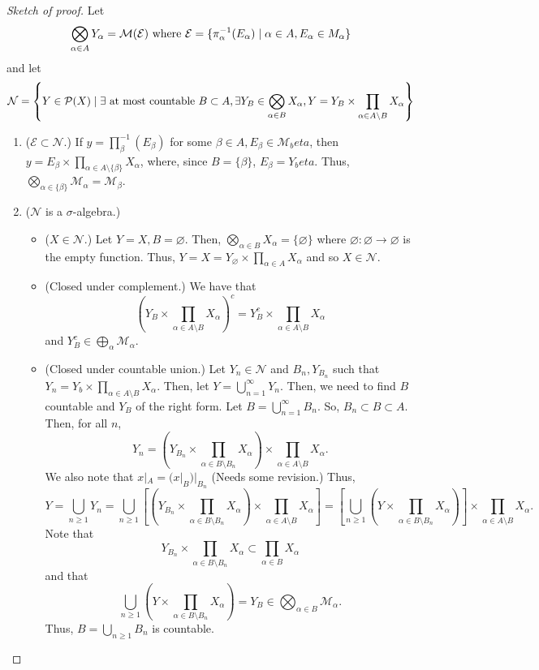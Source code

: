 \documentclass[11pt,leqno,oneside]{amsbook}
\numberwithin{thm}{section}
\renewcommand{\P}{\mathcal{P}} %
\newcommand{\M}{\mathcal{M}} %
\newcommand{\Ep}{\mathcal{E}} %
\newcommand{\s}{$\sigma$-} %
\begin{document}
\begin{proof}[Sketch of proof]
  Let \[
    \bigotimes_{\alpha \in A} Y_\alpha = \M(\Ep) \text{ where } \Ep =
    \{\pi_\alpha^{-1}(E_\alpha) \st \alpha \in A, E_\alpha \in M_\alpha\}
  \] and let \[
    \mathcal{N} = \left\{ Y \in \P(X) \st \exists \text{ at most countable
    } B \subset A, \exists Y_B \in \bigotimes_{\alpha \in B} X_\alpha,
    Y = Y_B \times \prod_{\alpha \in A \setminus B} X_\alpha \right\}
  \]
  \begin{enumerate}
  \item ($\Ep \subset \mathcal{N}$.) If $y =
    \prod_\beta^{-1}(E_\beta)$ for some $\beta \in A, E_\beta \in
    \M_beta$, then $y = E_\beta \times \prod_{\alpha \in A \setminus
      \{\beta\}} X_\alpha$, where, since $B = \{\beta\}$, $E_\beta =
    Y_beta$. Thus, $\bigotimes_{\alpha \in \{\beta\}} \M_\alpha =
    \M_\beta$.
  \item ($\mathcal{N}$ is a \s algebra.)
    \begin{itemize}
    \item ($X \in \mathcal{N}$.) Let $Y = X, B = \varnothing$. Then,
      $\bigotimes_{\alpha \in B} X_\alpha = \{\pmb{\varnothing}\}$
      where $\pmb{\varnothing}: \varnothing \to \varnothing$ is the
      empty function. Thus, $Y = X = Y_\varnothing \times
      \prod_{\alpha \in A} X_\alpha$ and so $X \in \mathcal{N}$.
    \item (Closed under complement.) We have that \[
        \left( Y_B \times \prod_{\alpha \in A \setminus B} X_\alpha
        \right)^c = Y_B^c \times \prod_{\alpha \in A \setminus B} X_\alpha
      \]
      and $Y_B^c \in \bigoplus_{\alpha} \M_\alpha$.
    \item (Closed under countable union.) Let $Y_n \in \mathcal{N}$
      and $B_n, Y_{B_n}$ such that $Y_n = Y_b \times \prod_{\alpha \in
      A \setminus B} X_\alpha$. Then, let $Y = \bigcup_{n=1}^\infty
    Y_n$. Then, we need to find $B$ countable and $Y_B$ of the right
    form. Let $B = \bigcup_{n=1}^\infty B_n$. So, $B_n \subset B
    \subset A$. Then, for all $n$, \[
      Y_n = \left( Y_{B_n} \times \prod_{\alpha \in B \setminus B_n}
        X_\alpha \right) \times \prod_{\alpha \in A \setminus B} X_\alpha.
    \]
    We also note that $x|_A = (x|_B)|_{B_n}$ (Needs some revision.) Thus,
    \[
      Y = \bigcup_{n \geq 1} Y_n = \bigcup_{n \geq 1} \left[ \left(
          Y_{B_n} \times \prod_{\alpha \in B \setminus B_n} X_\alpha
        \right) \times \prod_{\alpha \in A \setminus B} X_\alpha
      \right] = \left[ \bigcup_{n \geq 1} \left( Y \times
          \prod_{\alpha \in B \setminus B_n} X_\alpha \right) \right]
      \times \prod_{\alpha \in A \setminus B} X_\alpha.
    \]
    Note that \[
       Y_{B_n} \times \prod_{\alpha \in B \setminus B_n}
        X_\alpha  \subset \prod_{\alpha \in B} X_\alpha
      \]
      and that \[
        \bigcup_{n \geq 1} \left( Y \times
          \prod_{\alpha \in B \setminus B_n} X_\alpha \right) = Y_B
        \in \bigotimes_{\alpha \in B} \M_\alpha.
      \]
    Thus, $B = \bigcup_{n \geq 1} B_n$ is countable.
    \end{itemize}
  \end{enumerate}
\end{proof}
\end{document}
